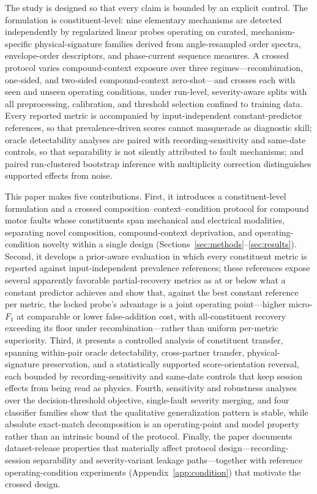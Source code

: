 The study is designed so that every claim is bounded by an explicit control.
The formulation is constituent-level: nine elementary mechanisms are
detected independently by regularized linear probes operating on curated,
mechanism-specific physical-signature families derived from angle-resampled
order spectra, envelope-order descriptors, and phase-current sequence
measures. A crossed protocol varies compound-context exposure over three
regimes---recombination, one-sided, and two-sided compound-context
zero-shot---and crosses each with seen and unseen operating conditions,
under run-level, severity-aware splits with all preprocessing, calibration,
and threshold selection confined to training data. Every reported metric is
accompanied by input-independent constant-predictor references, so that
prevalence-driven scores cannot masquerade as diagnostic skill; oracle
detectability analyses are paired with recording-sensitivity and same-date
controls, so that separability is not silently attributed to fault
mechanisms; and paired run-clustered bootstrap inference with multiplicity
correction distinguishes supported effects from noise.

This paper makes five contributions. First, it introduces a
constituent-level formulation and a crossed
composition--context--condition protocol for compound motor faults whose
constituents span mechanical and electrical modalities, separating novel
composition, compound-context deprivation, and operating-condition novelty
within a single design (Sections~\ref{sec:methods}--\ref{sec:results}).
Second, it develops a prior-aware evaluation in which every constituent
metric is reported against input-independent prevalence references; these
references expose several apparently favorable partial-recovery metrics as
at or below what a constant predictor achieves and show that, against the
best constant reference per metric, the locked probe's advantage is a joint
operating point---higher micro-$F_1$ at comparable or lower false-addition
cost, with all-constituent recovery exceeding its floor under
recombination---rather than uniform per-metric superiority. Third, it
presents a controlled analysis of constituent transfer, spanning
within-pair oracle detectability, cross-partner transfer,
physical-signature preservation, and a statistically supported
score-orientation reversal, each bounded by recording-sensitivity and
same-date controls that keep session effects from being read as physics.
Fourth, sensitivity and robustness analyses over the decision-threshold
objective, single-fault severity merging, and four classifier families show
that the qualitative generalization pattern is stable, while absolute
exact-match decomposition is an operating-point and model property rather
than an intrinsic bound of the protocol. Finally, the paper documents
dataset-release properties that materially affect protocol
design---recording-session separability and severity-variant leakage
paths---together with reference operating-condition experiments
(Appendix~\ref{app:condition}) that motivate the crossed design.

